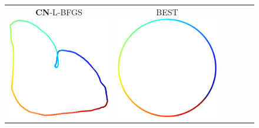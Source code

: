 \documentclass[dvipdfmx,10pt,journal,compsoc]{IEEEtran}
\begin{document}
\begin{figure}[btp]
\begin{tabular}{cccccc}
    \makecell{\small{\textsf{\textbf{CN}-L-BFGS}}                                                                                                        \\[-0.2em]\includegraphics[width=0.27\columnwidth]{individual/vis/cycle300_CN-L-BFGS.png}} &
    \makecell{\small{\textsf{BEST}}                                                                                                                      \\[-0.2em]\includegraphics[width=0.27\columnwidth]{individual/vis/opt_cycle300.png}} \\


\end{tabular}
\end{figure}
\end{document}
